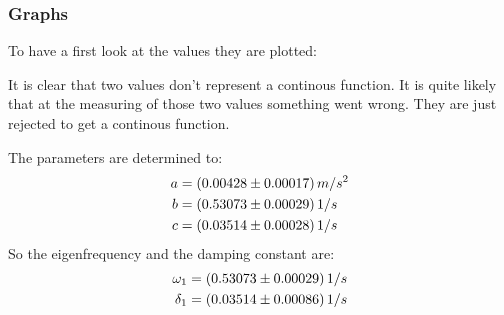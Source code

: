 \subsubsection{Graphs}
To have a first look at the values they are plotted:
\begin{center}
\begin{minipage}{\linewidth}
\centering
{}
\end{minipage}
\end{center}
It is clear that two values don't represent a continous function. It is quite likely that at the measuring of 
those two values something went wrong. They are just rejected to get a continous function.
\begin{center}
\begin{minipage}{\linewidth}
\centering
{}
\end{minipage}
\end{center}
The parameters are determined to:
\begin{align}
a &= (0.00428 \pm 0.00017) \, m/s^2 \notag \\
b &= (0.53073 \pm 0.00029) \, 1/s \notag \\
c &= (0.03514 \pm 0.00028) \, 1/s \notag
\end{align}
So the eigenfrequency and the damping constant are:
\begin{align}
\omega_1 &= (0.53073 \pm 0.00029) \, 1/s \notag \\
\delta_1 &= (0.03514 \pm 0.00086) \, 1/s \notag
\end{align}
